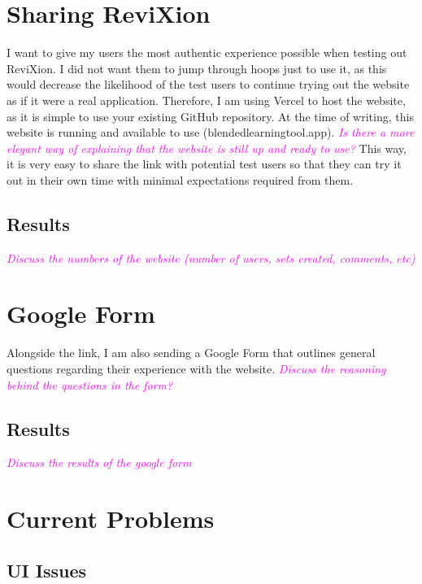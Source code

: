 \documentclass{report}
\begin{document}
\section{Sharing ReviXion}

I want to give my users the most authentic experience possible when testing out ReviXion.
I did not want them to jump through hoops just to use it,
as this would decrease the likelihood of the test users to continue trying out the website as if it were a real application.
Therefore, I am using Vercel to host the website, as it is simple to use your existing GitHub repository.
At the time of writing, this website is running and available to use (blendedlearningtool.app).
\textcolor{magenta}{\textit{Is there a more elegant way of explaining that the website is still up and ready to use?}}
This way, it is very easy to share the link with potential test users so that they can try it out in their own time with minimal expectations required from them.

\subsection{Results}

\textcolor{magenta}{\textit{Discuss the numbers of the website (number of users, sets created, comments, etc)}}

\section{Google Form}

Alongside the link, I am also sending a Google Form that outlines general questions regarding their experience with the website.
\textcolor{magenta}{\textit{Discuss the reasoning behind the questions in the form?}}

\subsection{Results}

\textcolor{magenta}{\textit{Discuss the results of the google form}}

\section{Current Problems}

\subsection{UI Issues}
\end{document}
